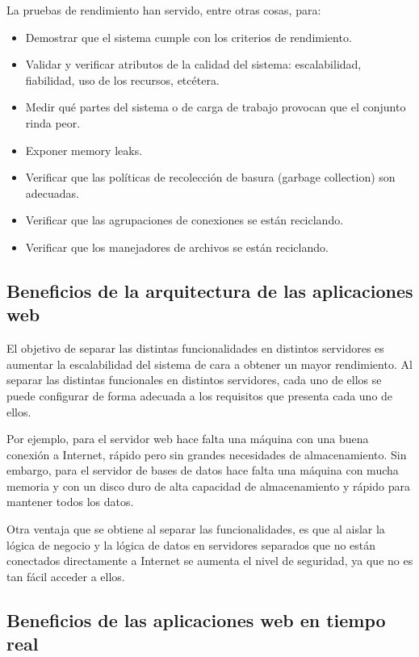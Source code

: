 La pruebas de rendimiento han servido, entre otras cosas, para:

\begin{itemize}
  \item Demostrar que el sistema cumple con los criterios de rendimiento.
  \item Validar y verificar atributos de la calidad del sistema: escalabilidad, fiabilidad, uso de los recursos, etcétera.
  \item Medir qué partes del sistema o de carga de trabajo provocan que el conjunto rinda peor.
  \item Exponer memory leaks.
  \item Verificar que las políticas de recolección de basura (garbage collection) son adecuadas.
  \item Verificar que las agrupaciones de conexiones se están reciclando.
  \item Verificar que los manejadores de archivos se están reciclando.
\end{itemize}

\subsection{Beneficios de la arquitectura de las aplicaciones web}

El objetivo de separar las distintas funcionalidades en distintos servidores es aumentar la escalabilidad del sistema de cara a obtener un mayor rendimiento. Al separar las distintas funcionales en distintos servidores, cada uno de ellos se puede configurar de forma adecuada a los requisitos que presenta cada uno de ellos.

Por ejemplo, para el servidor web hace falta una máquina con una buena conexión a Internet, rápido pero sin grandes necesidades de almacenamiento. Sin embargo, para el servidor de bases de datos hace falta una máquina con mucha memoria y con un disco duro de alta capacidad de almacenamiento y rápido para mantener todos los datos.

Otra ventaja que se obtiene al separar las funcionalidades, es que al aislar la lógica de negocio y la lógica de datos en servidores separados que no están conectados directamente a Internet se aumenta el nivel de seguridad, ya que no es tan fácil acceder a ellos.

\subsection{Beneficios de las aplicaciones web en tiempo real}


